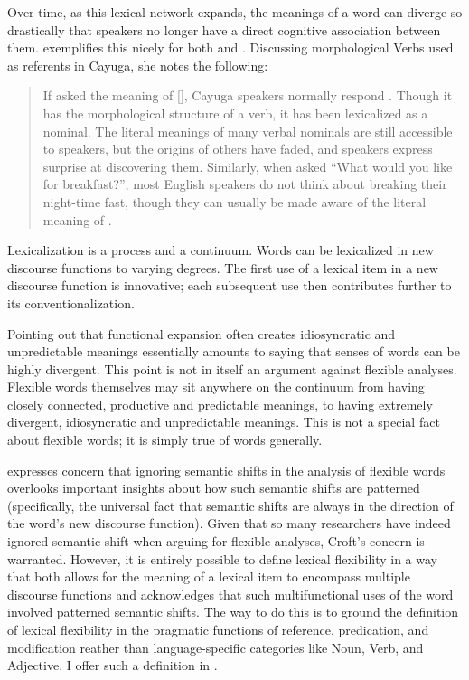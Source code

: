 Over time, as this lexical network expands, the meanings of a word can diverge so drastically that speakers no longer have a direct cognitive association between them. \citeauthor{Mithun2000} exemplifies this nicely for both  and . Discussing morphological Verbs used as referents in Cayuga, she notes the following:

\blockquote[{\cite[413]{Mithun2000}}]{If asked the meaning of  [], Cayuga speakers normally respond . Though it has the morphological structure of a verb, it has been lexicalized as a nominal. The literal meanings of many verbal nominals are still accessible to speakers, but the origins of others have faded, and speakers express surprise at discovering them. Similarly, when asked \enquote{What would you like for breakfast?}, most English speakers do not think about breaking their night-time fast, though they can usually be made aware of the literal meaning of .}

\noindent Lexicalization is a process and a continuum. Words can be lexicalized in new discourse functions to varying degrees. The first use of a lexical item in a new discourse function is innovative; each subsequent use then contributes further to its conventionalization.

Pointing out that functional expansion often creates idiosyncratic and unpredictable meanings essentially amounts to saying that senses of words can be highly divergent. This point is not in itself an argument against flexible analyses. Flexible words themselves may sit anywhere on the continuum from having closely connected, productive and predictable meanings, to having extremely divergent, idiosyncratic and unpredictable meanings. This is not a special fact about flexible words; it is simply true of words generally.

\textcite[73]{Croft2001b} expresses concern that ignoring semantic shifts in the analysis of flexible words overlooks important insights about how such semantic shifts are patterned (specifically, the universal fact that semantic shifts are always in the direction of the word's new discourse function). Given that so many researchers have indeed ignored semantic shift when arguing for flexible analyses, Croft's concern is warranted. However, it is entirely possible to define lexical flexibility in a way that both allows for the meaning of a lexical item to encompass multiple discourse functions and acknowledges that such multifunctional uses of the word involved patterned semantic shifts. The way to do this is to ground the definition of lexical flexibility in the pragmatic functions of reference, predication, and modification reather than language-specific categories like Noun, Verb, and Adjective. I offer such a definition in .

